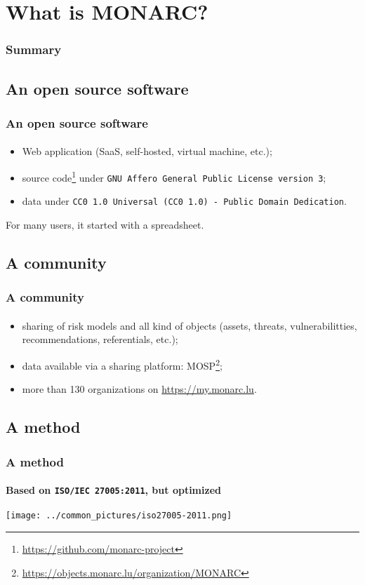 %
%
\section{What is MONARC?}
\begin{frame}
    \frametitle{Summary}
\end{frame}
\subsection{An open source software}
\begin{frame}
\frametitle{An open source software}
\framesubtitle{}
    \begin{itemize}
        \item Web application (SaaS, self-hosted, virtual machine, etc.);
        \item source code\footnote{\url{https://github.com/monarc-project}} under \texttt{GNU Affero General Public License version 3};
        \item data under \texttt{CC0 1.0 Universal (CC0 1.0) - Public Domain Dedication}.
    \end{itemize}
    \bigskip
    For many users, it started with a spreadsheet.
\end{frame}

\subsection{A community}
\begin{frame}
\frametitle{A community}
\framesubtitle{}
    \begin{itemize}
        \item sharing of risk models and all kind of objects (assets, threats, vulnerabilitties, recommendations, referentials, etc.);
        \item data available via a sharing platform: MOSP\footnote{\url{https://objects.monarc.lu/organization/MONARC}};
        \item more than 130 organizations on \url{https://my.monarc.lu}.
    \end{itemize}
\end{frame}

\subsection{A method}
\begin{frame}
\frametitle{A method}
\framesubtitle{Based on \texttt{ISO/IEC 27005:2011}, but optimized}
    \begin{center}
        \texttt{[image: ../common\_pictures/iso27005-2011.png]}
    \end{center}
\end{frame}
